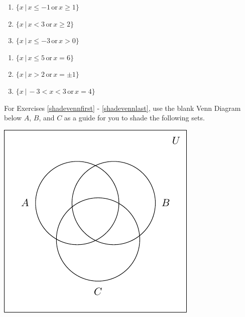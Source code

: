 \documentclass[11pt]{article}
\theoremstyle{definition}  %
\newcounter{HW}
\begin{document}
\begin{multicols}{3}
\begin{enumerate}
\setcounter{enumi}{\value{HW}}

\item $\{x\,|\, x \leq -1 \, \text{or} \, x \geq 1 \}$
\item $\{x\,|\, x < 3 \, \text{or} \, x \geq 2 \}$
\item $\{x\,|\, x \leq -3 \, \text{or} \, x > 0 \}$

\setcounter{HW}{\value{enumi}}
\end{enumerate}
\end{multicols}

\begin{multicols}{3}
\begin{enumerate}
\setcounter{enumi}{\value{HW}}

\item $\{x\,|\, x \leq 5 \, \text{or} \, x = 6 \}$
\item $\{x\,|\, x > 2 \, \text{or} \, x = \pm 1 \}$
\item $\{x\,|\,  -3 < x < 3 \, \text{or} \, x = 4 \}$ \label{writeintervallast}

\setcounter{HW}{\value{enumi}}
\end{enumerate}
\end{multicols}

For Exercises \ref{shadevennfirst} - \ref{shadevennlast}, use the blank Venn Diagram below $A$, $B$, and $C$ as a guide for you to shade the following sets.

\begin{center}
\includegraphics{SetTheory-29}

\end{center}
\end{document}
